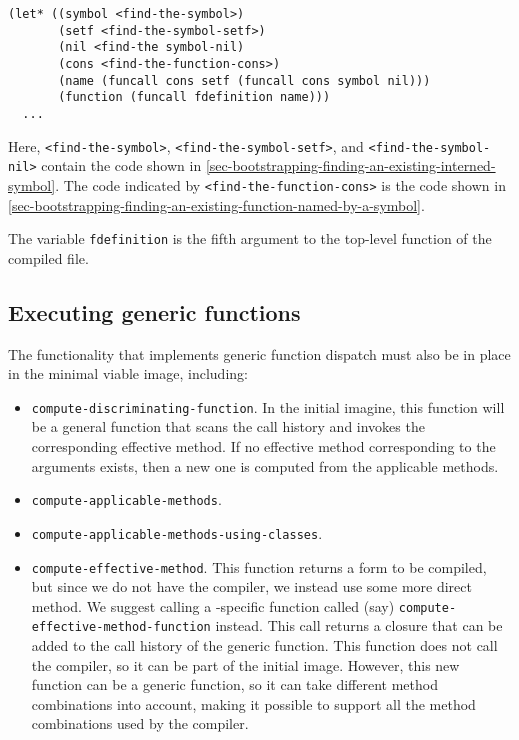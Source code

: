 \begin{verbatim}
(let* ((symbol <find-the-symbol>)
       (setf <find-the-symbol-setf>)
       (nil <find-the symbol-nil)
       (cons <find-the-function-cons>)
       (name (funcall cons setf (funcall cons symbol nil)))
       (function (funcall fdefinition name)))
  ...
\end{verbatim}

Here, \texttt{<find-the-symbol>}, \texttt{<find-the-symbol-setf>}, and
\texttt{<find-the-symbol-nil>} contain the code shown in
\ref{sec-bootstrapping-finding-an-existing-interned-symbol}.  The code
indicated by \texttt{<find-the-function-cons>} is the code shown in
\ref{sec-bootstrapping-finding-an-existing-function-named-by-a-symbol}.

The variable \texttt{fdefinition} is the fifth argument to the
top-level function of the compiled file.

\subsection{Executing generic functions}
\label{sec-bootstrapping-executing-generic-functions}

The functionality that implements generic function dispatch must also
be in place in the minimal viable image, including:

\begin{itemize}
\item \texttt{compute-discriminating-function}.  In the initial
  imagine, this function will be a general function that scans the
  call history and invokes the corresponding effective method.  If no
  effective method corresponding to the arguments exists, then a new
  one is computed from the applicable methods.
\item \texttt{compute-applicable-methods}.
\item \texttt{compute-applicable-methods-using-classes}.
\item \texttt{compute-effective-method}.  This function returns a form
  to be compiled, but since we do not have the compiler, we instead
  use some more direct method.  We suggest calling a
  \sysname{}-specific function called (say)
  \texttt{compute-effective-method-function} instead.  This call
  returns a closure that can be added to the call history of the
  generic function.  This function does not call the compiler, so it
  can be part of the initial image.  However, this new function can be
  a generic function, so it can take different method combinations
  into account, making it possible to support all the method
  combinations used by the compiler.
\end{itemize}

